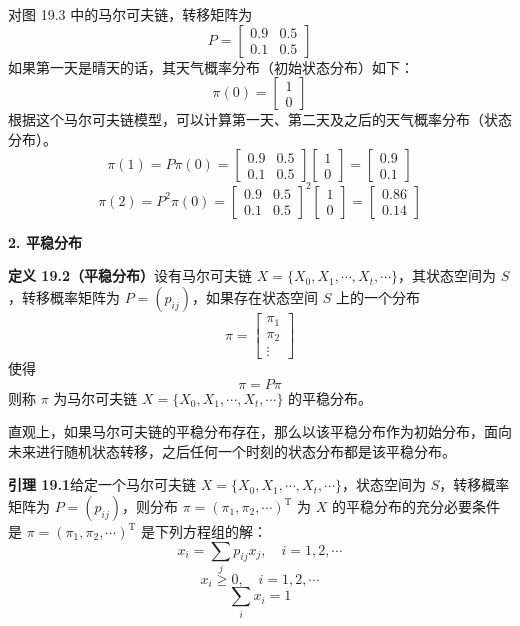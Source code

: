 \documentclass[UTF8,12pt,a4paper,fontset=fandol]{ctexart}
\begin{document}
对图 19.3 中的马尔可夫链，转移矩阵为
\[
P=
\begin{bmatrix}
0.9 & 0.5\\
0.1 & 0.5
\end{bmatrix}
\]
如果第一天是晴天的话，其天气概率分布（初始状态分布）如下：
\[
\pi(0)=
\begin{bmatrix}
1\\
0
\end{bmatrix}
\]
根据这个马尔可夫链模型，可以计算第一天、第二天及之后的天气概率分布（状态分布）。
\[
\pi(1)=P\pi(0)=
\begin{bmatrix}
0.9 & 0.5\\
0.1 & 0.5
\end{bmatrix}
\begin{bmatrix}
1\\
0
\end{bmatrix}
=
\begin{bmatrix}
0.9\\
0.1
\end{bmatrix}
\]
\[
\pi(2)=P^2\pi(0)=
\begin{bmatrix}
0.9 & 0.5\\
0.1 & 0.5
\end{bmatrix}^2
\begin{bmatrix}
1\\
0
\end{bmatrix}
=
\begin{bmatrix}
0.86\\
0.14
\end{bmatrix}
\]

\noindent\textbf{2. 平稳分布}

\noindent\textbf{定义 19.2（平稳分布）}\quad 设有马尔可夫链 $X=\{X_0,X_1,\cdots,X_t,\cdots\}$，其状态空间为 $S$，转移概率矩阵为 $P=(p_{ij})$，如果存在状态空间 $S$ 上的一个分布
\[
\pi=
\begin{bmatrix}
\pi_1\\
\pi_2\\
\vdots
\end{bmatrix}
\]
使得
\begin{equation}
\pi=P\pi
\tag{19.15}
\end{equation}
则称 $\pi$ 为马尔可夫链 $X=\{X_0,X_1,\cdots,X_t,\cdots\}$ 的平稳分布。

直观上，如果马尔可夫链的平稳分布存在，那么以该平稳分布作为初始分布，面向未来进行随机状态转移，之后任何一个时刻的状态分布都是该平稳分布。

\noindent\textbf{引理 19.1}\quad 给定一个马尔可夫链 $X=\{X_0,X_1,\cdots,X_t,\cdots\}$，状态空间为 $S$，转移概率矩阵为 $P=(p_{ij})$，则分布 $\pi=(\pi_1,\pi_2,\cdots)^{\mathrm{T}}$ 为 $X$ 的平稳分布的充分必要条件是 $\pi=(\pi_1,\pi_2,\cdots)^{\mathrm{T}}$ 是下列方程组的解：
\begin{equation}
x_i=\sum_j p_{ij}x_j,\quad i=1,2,\cdots
\tag{19.16}
\end{equation}
\begin{equation}
x_i\geqslant 0,\quad i=1,2,\cdots
\tag{19.17}
\end{equation}
\begin{equation}
\sum_i x_i=1
\tag{19.18}
\end{equation}
\end{document}
